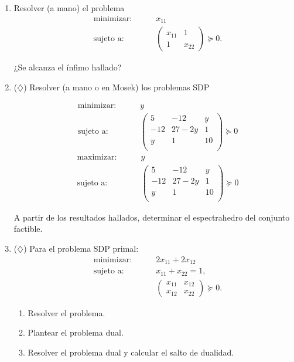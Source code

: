 \documentclass[11pt]{article}
\begin{document}
\begin{enumerate}[resume]

\item Resolver (a mano) el problema
\begin{alignat*}{2}
  & \text{minimizar: } & & x_{11} \\
  & \text{sujeto a: } & \quad &
  \begin{pmatrix} x_{11} & 1 \\ 1 & x_{22} \end{pmatrix} \succeq 0.
\end{alignat*}

¿Se alcanza el ínfimo hallado?

\pagebreak
\item ($\diamondsuit$) Resolver (a mano o en Mosek) los problemas SDP
\begin{multicols}{2}
\noindent
\begin{alignat*}{2}
  & \text{minimizar: } & & y \\
  & \text{sujeto a: } & \quad &
\begin{pmatrix}
5 & -12 & y \\
-12 & 27 - 2y & 1 \\
y & 1 & 10 \\
\end{pmatrix}  \succeq 0
\end{alignat*}
\begin{alignat*}{2}
  & \text{maximizar: } & & y \\
  & \text{sujeto a: } & \quad &
\begin{pmatrix}
5 & -12 & y \\
-12 & 27 - 2y & 1 \\
y & 1 & 10 \\
\end{pmatrix}  \succeq 0
\end{alignat*}
\end{multicols}

A partir de los resultados hallados, determinar el espectrahedro del conjunto factible.

\item ($\diamondsuit$) Para el problema SDP primal:
\begin{alignat*}{2}
  & \text{minimizar: } & & 2x_{11} + 2x_{12} \\
  & \text{sujeto a: } & \quad & x_{11} + x_{22} = 1, \\
  & & & \begin{pmatrix} x_{11} & x_{12} \\ x_{12} & x_{22}  \end{pmatrix} \succeq 0.
\end{alignat*}
\begin{enumerate}
\item Resolver el problema.
\item Plantear el problema dual.
\item Resolver el problema dual y calcular el salto de dualidad.
\end{enumerate}


\end{enumerate}
\end{document}
